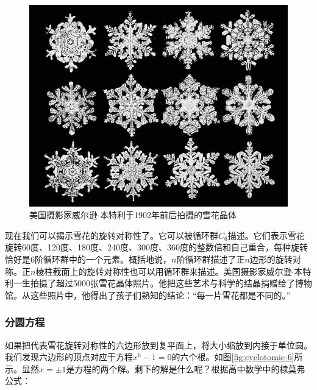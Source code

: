 \documentclass[b5paper]{ctexart}
\begin{document}
\begin{figure}[htbp]
 \centering
 \includegraphics[scale=0.3]{img/snowflakes.jpg}
 \caption{美国摄影家威尔逊$\cdot$本特利于1902年前后拍摄的雪花晶体}
 \label{fig:snowflakes}
\end{figure}


现在我们可以揭示雪花的旋转对称性了。它可以被循环群$C_6$描述。它们表示雪花旋转60度、120度、180度、240度、300度、360度的整数倍和自己重合，每种旋转恰好是6阶循环群中的一个元素。概括地说，$n$阶循环群描述了正$n$边形的旋转对称。正$n$棱柱截面上的旋转对称性也可以用循环群来描述。美国摄影家威尔逊$\cdot$本特利一生拍摄了超过5000张雪花晶体照片。他把这些艺术与科学的结晶捐赠给了博物馆。从这些照片中，他得出了孩子们熟知的结论：“每一片雪花都是不同的。”

\subsubsection{分圆方程}

如果把代表雪花旋转对称性的六边形放到复平面上，将大小缩放到内接于单位圆。我们发现六边形的顶点对应于方程$x^6 - 1 = 0$的六个根。如图\ref{fig:cyclotomic-6}所示。显然$x = \pm 1$是方程的两个解。剩下的解是什么呢？根据高中数学中的棣莫弗公式：
\end{document}
